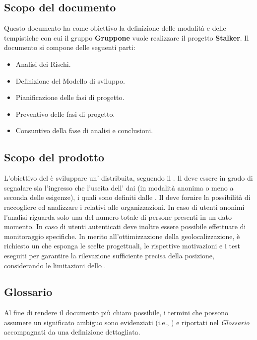 \documentclass[../piano-di-progetto.tex]{subfiles}
\begin{document}
\subsection{Scopo del documento}%
\label{sub:scopo_del_documento}
Questo documento ha come obiettivo la definizione delle modalità e delle tempistiche con cui il gruppo \textbf{Gruppone} vuole realizzare il progetto \textbf{Stalker}.
Il documento si compone delle seguenti parti:
\begin{itemize}
  \item Analisi dei Rischi.
  \item Definizione del Modello di sviluppo.
  \item Pianificazione delle fasi di progetto.
  \item Preventivo delle fasi di progetto.
  \item Consuntivo della fase di analisi e conclusioni.
\end{itemize}
\subsection{Scopo del prodotto}%
\label{sub:scopo_del_prodotto}
L'obiettivo del  è sviluppare un' distribuita, seguendo il .
Il  deve essere in grado di segnalare sia l'ingresso che l'uscita dell' dai  (in modalità anonima o meno a seconda delle esigenze), i quali sono definiti dalle .
Il  deve fornire la possibilità di raccogliere ed analizzare i  relativi alle organizzazioni.
In caso di utenti anonimi l'analisi riguarda solo una  del numero totale di persone presenti in un dato momento.
In caso di utenti autenticati deve inoltre essere possibile effettuare  di monitoraggio specifiche.
In merito all'ottimizzazione della geolocalizzazione, è richiesto un  che esponga le scelte progettuali, le rispettive motivazioni e i test eseguiti per garantire la rilevazione sufficiente precisa della posizione, considerando le limitazioni dello .
\subsection{Glossario}%
\label{sub:glossario}
Al fine di rendere il documento più chiaro possibile, i termini che possono assumere un significato ambiguo sono evidenziati (i.e., ) e riportati nel \textit{Glossario} accompagnati da una definizione dettagliata.
\end{document}
